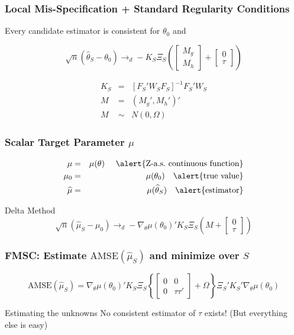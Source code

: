 \begin{frame}
\frametitle{Local Mis-Specification + Standard Regularity Conditions}

\alert{Every candidate estimator} is consistent for $\theta_0$ and

$$\sqrt{n}(\widehat{\theta}_S - \theta_0 ) \rightarrow_d -K_S \Xi_S  \left(\left[\begin{array}
	{c} M_g \\ M_h
\end{array} \right]  + \left[\begin{array}
	{c} 0 \\ \tau
\end{array} \right]\right)$$

\begin{eqnarray*}
	K_S &=&[F_S'W_SF_S]^{-1} F_S'W_S\\
	M&=&(M_g', M_h')'\\
	M&\sim&N(0,\Omega)
\end{eqnarray*}
\end{frame}
\begin{frame}
\frametitle{Scalar Target Parameter $\mu$}
\begin{eqnarray*}
	\mu &=& \mu(\theta) \quad \mbox{ \alert{Z-a.s.\ continuous function}}\\
	\mu_0 &=& \mu(\theta_0) \quad \mbox{\alert{true value}}\\
	\widehat{\mu} &=& \mu(\widehat{\theta}_S) \quad \mbox{\alert{estimator}}
\end{eqnarray*}

\begin{block}
	{Delta Method}
$$\sqrt{n}\left(\widehat{\mu}_S - \mu_0\right)\rightarrow_d-\nabla_\theta\mu(\theta_0)'K_S \Xi_S \left(M +  \left[\begin{array}
	{c} 0 \\ \tau
\end{array} \right]\right)$$ 
\end{block}

\end{frame}

\begin{frame}
	\frametitle{FMSC: Estimate $\mbox{AMSE}(\widehat{\mu}_S)$ and minimize over $S$}

	$$\mbox{AMSE}\left(\widehat{\mu}_S\right) = \nabla_\theta\mu(\theta_0)'K_S \Xi_S \left\{\left[\begin{array}{cc}0&0\\0&\tau\tau'\end{array}\right] + \Omega\right\}\Xi_S'K_S'\nabla_\theta\mu(\theta_0)$$
	
	\begin{block}{Estimating the unknowns}
	No consistent estimator of $\tau$ exists! (But everything else is easy)
	\end{block}
\end{frame}

